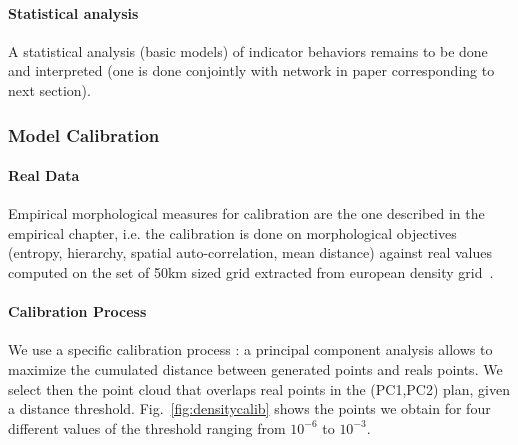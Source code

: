 

\paragraph{Statistical analysis}


A statistical analysis (basic models) of indicator behaviors remains to be done and interpreted (one is done conjointly with network in paper corresponding to next section).

\subsubsection{Model Calibration}

\paragraph{Real Data}



Empirical morphological measures for calibration are the one described in the empirical chapter, i.e. the calibration is done on morphological objectives (entropy, hierarchy, spatial auto-correlation, mean distance) against real values computed on the set of 50km sized grid extracted from european density grid~\cite{eurostat}.



\paragraph{Calibration Process}

We use a specific calibration process : a principal component analysis allows to maximize the cumulated distance between generated points and reals points. We select then the point cloud that overlaps real points in the (PC1,PC2) plan, given a distance threshold. Fig.~\ref{fig:densitycalib} shows the points we obtain for four different values of the threshold ranging from $10^{-6}$ to $10^{-3}$.



